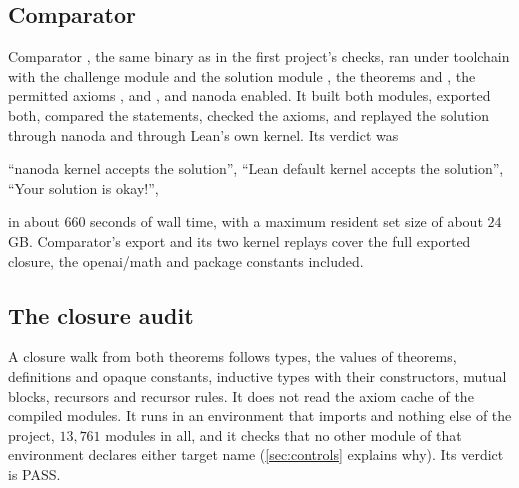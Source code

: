 \documentclass[11pt]{article}
\theoremstyle{definition}
\begin{document}
{\subsection{Comparator}\label{sec:comparator}

Comparator \cite{Comparator}, the same binary as in the first project's checks, ran under toolchain  with the challenge module  and the solution module , the theorems  and , the permitted axioms ,  and , and nanoda enabled. It built both modules, exported both, compared the statements, checked the axioms, and replayed the solution through nanoda \cite{nanoda} and through Lean's own kernel. Its verdict was
\begin{center}
``nanoda kernel accepts the solution'', \quad ``Lean default kernel accepts the solution'', \quad ``Your solution is okay!'',
\end{center}
in about $660$ seconds of wall time, with a maximum resident set size of about $24$\,GB. Comparator's export and its two kernel replays cover the full exported closure, the openai/math and package constants included.

\subsection{The closure audit}\label{sec:audit}

A closure walk from both theorems follows types, the values of theorems, definitions and opaque constants, inductive types with their constructors, mutual blocks, recursors and recursor rules. It does not read the axiom cache of the compiled modules. It runs in an environment that imports  and nothing else of the project, $13{,}761$ modules in all, and it checks that no other module of that environment declares either target name (\cref{sec:controls} explains why). Its verdict is PASS.

}
\end{document}
